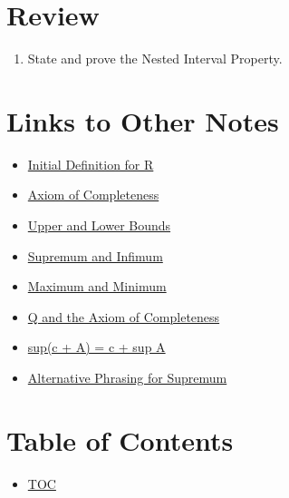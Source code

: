 \section*{Review}
\begin{enumerate}
  \item State and prove the Nested Interval Property.
\end{enumerate}


\section*{Links to Other Notes}
\begin{itemize}
  \item \hyperref[202501180703]{Initial Definition for R}
  \item \hyperref[202501180727]{Axiom of Completeness}
  \item \hyperref[202501180734]{Upper and Lower Bounds}
  \item \hyperref[202501180743]{Supremum and Infimum}
  \item \hyperref[202501181241]{Maximum and Minimum}
  \item \hyperref[202501181257]{Q and the Axiom of Completeness}
  \item \hyperref[202501181310]{sup(c + A) = c + sup A}
  \item \hyperref[202501181335]{Alternative Phrasing for Supremum}
\end{itemize}

\section*{Table of Contents}

\begin{itemize}
  \item \hyperref[toc]{TOC}
\end{itemize}

